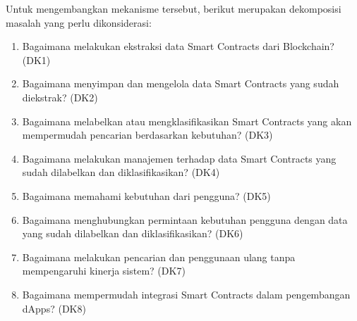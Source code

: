 Untuk mengembangkan mekanisme tersebut, berikut merupakan dekomposisi masalah yang perlu dikonsiderasi:

\begin{enumerate}
  \item Bagaimana melakukan ekstraksi data Smart Contracts dari Blockchain? (DK1)
  \item Bagaimana menyimpan dan mengelola data Smart Contracts yang sudah diekstrak? (DK2)
  \item Bagaimana melabelkan atau mengklasifikasikan Smart Contracts yang akan mempermudah pencarian berdasarkan kebutuhan? (DK3)
  \item Bagaimana melakukan manajemen terhadap data Smart Contracts yang sudah dilabelkan dan diklasifikasikan? (DK4)
  \item Bagaimana memahami kebutuhan dari pengguna? (DK5)
  \item Bagaimana menghubungkan permintaan kebutuhan pengguna dengan data yang sudah dilabelkan dan diklasifikasikan? (DK6)
  \item Bagaimana melakukan pencarian dan penggunaan ulang tanpa mempengaruhi kinerja sistem? (DK7)
  \item Bagaimana mempermudah integrasi Smart Contracts dalam pengembangan dApps? (DK8)
\end{enumerate}

